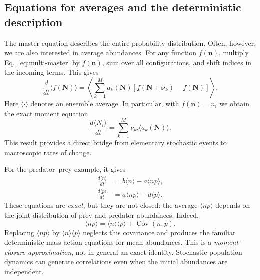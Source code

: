 \subsection{Equations for averages and the deterministic description}
\label{subsec:multi-moments}

The master equation describes the entire probability distribution. Often,
however, we are also interested in average abundances. For any function
$f(\mathbf n)$, multiply Eq.~\eqref{eq:multi-master} by $f(\mathbf n)$,
sum over all configurations, and shift indices in the incoming terms. This
gives
\begin{equation}
 \boxed{\displaystyle
 \frac{d}{dt}\langle f(\mathbf N)\rangle
 =\left\langle\sum_{k=1}^{M}a_k(\mathbf N)
    [f(\mathbf N+\boldsymbol\nu_k)-f(\mathbf N)]\right\rangle.}
 \label{eq:multi-observable}
\end{equation}
Here $\langle\cdot\rangle$ denotes an ensemble average. In particular,
with $f(\mathbf n)=n_i$ we obtain the exact moment equation
\begin{equation}
 \boxed{\displaystyle
 \frac{d\langle N_i\rangle}{dt}
   =\sum_{k=1}^{M}\nu_{ki}\langle a_k(\mathbf N)\rangle.}
 \label{eq:multi-first-moment}
\end{equation}
This result provides a direct bridge from elementary stochastic events to
macroscopic rates of change.

For the predator--prey example, it gives
\begin{align}
 \frac{d\langle n\rangle}{dt}
      &=b\langle n\rangle-a\langle np\rangle,\\
 \frac{d\langle p\rangle}{dt}
      &=a\langle np\rangle-d\langle p\rangle.
 \label{eq:multi-predator-means}
\end{align}
These equations are \emph{exact}, but they are not closed: the average
$\langle np\rangle$ depends on the joint distribution of prey and predator
abundances. Indeed,
\begin{equation}
 \langle np\rangle=\langle n\rangle\langle p\rangle
                       +\operatorname{Cov}(n,p).
 \label{eq:multi-covariance}
\end{equation}
Replacing $\langle np\rangle$ by
$\langle n\rangle\langle p\rangle$ neglects this covariance and produces
the familiar deterministic mass-action equations for mean abundances. This
is a \emph{moment-closure approximation}, not in general an exact identity.
Stochastic population dynamics can generate correlations even when the
initial abundances are independent.

